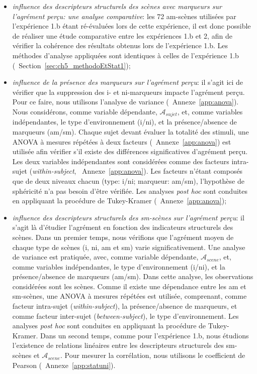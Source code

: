 \begin{itemize}
\item \emph{influence des descripteurs structurels des scènes avec marqueurs sur l'agrément perçu: une analyse comparative}: les 72 am-scènes utilisées par l'expérience 1.b étant ré-évaluées lors de cette expérience, il est donc possible de réaliser une étude comparative entre les expériences 1.b et 2, afin de vérifier la cohérence des résultats obtenus lors de l'expérience 1.b. Les méthodes d'analyse appliquées sont identiques à celles de l'expérience 1.b (\cf~Section~\ref{sec:ch5_methodoEtStat1});
\item \emph{influence de la présence des marqueurs sur l'agrément perçu}: il s'agit ici de vérifier que la suppression des i- et ni-marqueurs impacte l'agrément perçu. Pour ce faire, nous utilisons l'analyse de variance (\cf~Annexe~\ref{app:anova}). Nous considérons, comme variable dépendante,  $\mathcal{A}_{sujet}$, et, comme variables indépendantes, le type d'environnement (i/ni), et la présence/absence de marqueurs (am/sm). Chaque sujet devant évaluer la totalité des stimuli, une ANOVA à mesures répétées à deux facteurs (\cf~Annexe~\ref{app:anova}) est utilisée afin vérifier s'il existe des différences significatives d'agrément perçu. Les deux variables indépendantes sont considérées comme des facteurs intra-sujet (\emph{within-subject}, \cf~Annexe~\ref{app:anova}). Les facteurs n'étant composés que de deux niveaux chacun (type: i/ni; marqueur: am/sm), l'hypothèse de sphéricité n'a pas besoin d'être vérifiée. Les analyses \emph{post hoc} sont conduites en appliquant la procédure de Tukey-Kramer (\cf~Annexe~\ref{app:anova});
\item \emph{influence des descripteurs structurels des sm-scènes sur l'agrément perçu}: il s'agit là d'étudier l'agrément en fonction des indicateurs structurels des scènes. Dans un premier temps, nous vérifions que l'agrément moyen de chaque type de scènes (i, ni, am et sm) varie significativement. Une analyse de variance est pratiquée, avec, comme variable dépendante, $\mathcal{A}_{scene}$, et, comme variables indépendantes, le type d'environnement (i/ni), et la présence/absence de marqueurs (am/sm). Dans cette analyse, les observations considérées sont les scènes. Comme il existe une dépendance entre les am et sm-scènes, une ANOVA à mesures répétées est utilisée, comprenant, comme facteur intra-sujet (\emph{within-subject}), la présence/absence de marqueurs, et comme facteur inter-sujet (\emph{between-subject}), le type d'environnement. Les analyses \emph{post hoc} sont conduites en appliquant la procédure de Tukey-Kramer. Dans un second temps, comme pour l'expérience 1.b, nous étudions l'existence de relations linéaires entre les descripteurs structurels des sm-scènes et $\mathcal{A}_{scene}$. Pour mesurer la corrélation, nous utilisons le coefficient de Pearson (\cf~Annexe~\ref{app:statuni}).
\end{itemize}


